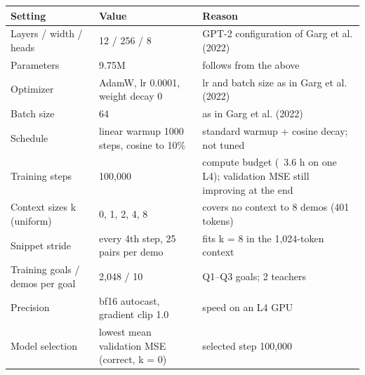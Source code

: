 \begin{tabular}{lll}
\toprule
Setting & Value & Reason \\
\midrule
Layers / width / heads & 12 / 256 / 8 & GPT-2 configuration of Garg et al. (2022) \\
Parameters & 9.75M & follows from the above \\
Optimizer & AdamW, lr 0.0001, weight decay 0 & lr and batch size as in Garg et al. (2022) \\
Batch size & 64 & as in Garg et al. (2022) \\
Schedule & linear warmup 1000 steps, cosine to 10\% & standard warmup + cosine decay; not tuned \\
Training steps & 100,000 & compute budget (~3.6 h on one L4); validation MSE still improving at the end \\
Context sizes k (uniform) & 0, 1, 2, 4, 8 & covers no context to 8 demos (401 tokens) \\
Snippet stride & every 4th step, 25 pairs per demo & fits k = 8 in the 1,024-token context \\
Training goals / demos per goal & 2,048 / 10 & Q1–Q3 goals; 2 teachers \\
Precision & bf16 autocast, gradient clip 1.0 & speed on an L4 GPU \\
Model selection & lowest mean validation MSE (correct, k = 0) & selected step 100,000 \\
\bottomrule
\end{tabular}
